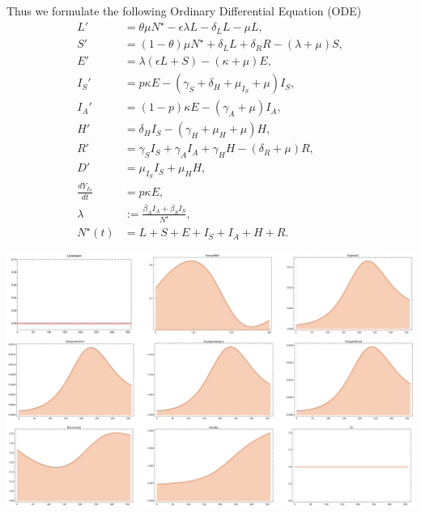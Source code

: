 Thus we formulate the following Ordinary Differential Equation (ODE)
\begin{equation}
	\label{eqn:base_dynamics}
    \begin{aligned}
        L' & = \theta \mu N^{\star}
        	-\epsilon \lambda L - \delta_L L - \mu L,
        \\
        S' & =
            (1 - \theta)\mu N^\star + \delta_L  L + \delta_R R
            - (\lambda + \mu) S,
        \\
        E' & =
            \lambda (\epsilon L + S) - (\kappa + \mu) E,
        \\
        I_S' & =
            p \kappa E -
            (\gamma_S +
                \delta_H +
                \mu_{I_S} +
                \mu) I_S,
        \\
        I_A' &=
            (1 - p) \kappa E - (\gamma_A + \mu) I_A,
        \\
        H' &=
            \delta_H I_S - (\gamma_H + \mu_H + \mu) H,
        \\
        R' & =
            \gamma_S I_S + \gamma_A I_A + \gamma_H H - (\delta_R + \mu) R,
        \\
        D' &=
            \mu_{I_S} I_S + \mu_H H,
        \\
        \frac{dY_{I_S}}{dt} &  = p \kappa E,
        \\
        \lambda &:=
            \frac{\beta_A I_A + \beta_S I_S}{N^{\star}},
        \\
        N^{\star}(t) &=
            L + S + E +
            I_S + I_A +
            H + R .
    \end{aligned}
\end{equation}
%
    \begin{center}
        \includegraphics[scale=0.25,
        keepaspectratio]{Figures/no_contraled_dynamics}
    \end{center}

